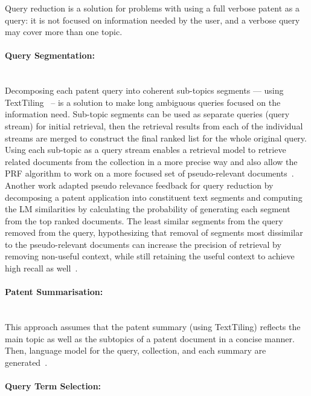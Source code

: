 Query reduction is a solution for problems with using a full verbose patent as a query: it is not focused on information needed by the user, and a verbose query may cover more than one topic.
\paragraph{Query Segmentation:} 
\ \\
Decomposing each patent query into coherent sub-topics segments --- using TextTiling~\citep{hearst1997texttiling} -- is a solution to make long ambiguous queries focused on the information need. Sub-topic segments can be used as separate queries (query stream) for initial retrieval, then the retrieval results from each of the individual streams are merged to construct the final ranked list for the whole original query. Using each sub-topic as a query stream enables a retrieval model to retrieve related documents from the collection in a more precise way and also allow the PRF algorithm to work on a more focused set of pseudo-relevant documents~\citep{takaki2004associative, ganguly2011united}. Another work adapted pseudo relevance feedback for query reduction by decomposing a patent application into constituent text segments and computing the LM similarities by calculating the probability of generating each segment from the top ranked documents. The least similar segments from the query removed from the query, hypothesizing that removal of segments most dissimilar to the pseudo-relevant documents can increase the precision of retrieval by removing non-useful context, while still retaining the useful context to achieve high recall as well~\citep{ganguly2011patent}.
\paragraph{Patent Summarisation:} 
\ \\
This approach assumes that the patent summary (using TextTiling) reflects the main topic as well as the subtopics of a patent document in a concise manner. Then, language model for the query, collection, and each summary are generated~\citep{mahdabi2011report}. 
\paragraph{Query Term Selection:}
\ \\

